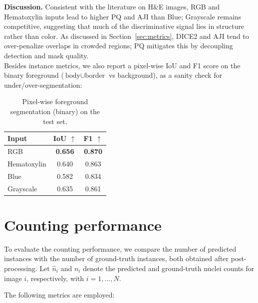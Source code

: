 \documentclass[target=bach,aauheader=,style=]{thud}
\begin{document}
\noindent\textbf{Discussion.} 
Consistent with the literature on H\&E images, RGB and Hematoxylin inputs lead to higher PQ and AJI than Blue; Grayscale remains competitive, suggesting that much of the discriminative signal lies in structure rather than color. 
As discussed in Section~\ref{sec:metrics}, DICE2 and AJI tend to over-penalize overlaps in crowded regions; PQ mitigates this by decoupling detection and mask quality.\\

Besides instance metrics, we also report a pixel-wise IoU and F1 score on the binary foreground ($\text{body}\cup\text{border}$ vs background), as a sanity check for under/over-segmentation:

\begin{table}[ht]
\centering
\caption{Pixel-wise foreground segmentation (binary) on the test set.}
\label{tab:pix-binary}
\small
\begin{tabular}{lcc}
\toprule
\textbf{Input} & \textbf{IoU} $\uparrow$ & \textbf{F1} $\uparrow$ \\
\midrule
RGB         & \textbf{0.656} & \textbf{0.870} \\
Hematoxylin & 0.640 & 0.863 \\
Blue        & 0.582 & 0.834 \\
Grayscale   & 0.635 & 0.861 \\
\bottomrule
\end{tabular}
\end{table}

\section{Counting performance}
To evaluate the counting performance, we compare the number of predicted instances with the number of ground-truth instances, both obtained after post-processing. 
Let $\hat{n}_i$ and $n_i$ denote the predicted and ground-truth nuclei counts for image $i$, respectively, with $i=1,\dots,N$.

The following metrics are employed:
\end{document}
